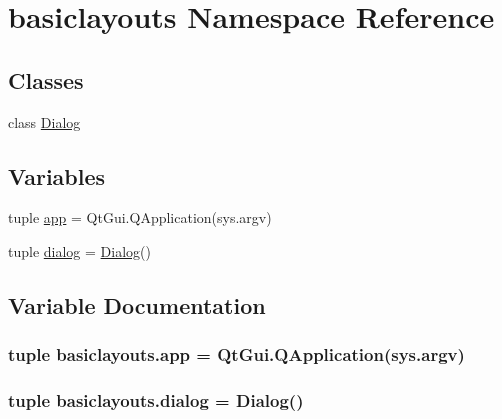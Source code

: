 \hypertarget{namespacebasiclayouts}{}\section{basiclayouts Namespace Reference}
\label{namespacebasiclayouts}
\subsection*{Classes}
\begin{DoxyCompactItemize}
\item 
class \hyperlink{classbasiclayouts_1_1Dialog}{Dialog}
\end{DoxyCompactItemize}
\subsection*{Variables}
\begin{DoxyCompactItemize}
\item 
tuple \hyperlink{namespacebasiclayouts_a4cdcdb35198e79ef26590fa42f82c362}{app} = Qt\+Gui.\+Q\+Application(sys.\+argv)
\item 
tuple \hyperlink{namespacebasiclayouts_a2ddb5b7046ab7b46b1d923a435b3187a}{dialog} = \hyperlink{classbasiclayouts_1_1Dialog}{Dialog}()
\end{DoxyCompactItemize}


\subsection{Variable Documentation}
\hypertarget{namespacebasiclayouts_a4cdcdb35198e79ef26590fa42f82c362}{}
\subsubsection[{app}]{\setlength{\rightskip}{0pt plus 5cm}tuple basiclayouts.\+app = Qt\+Gui.\+Q\+Application(sys.\+argv)}\label{namespacebasiclayouts_a4cdcdb35198e79ef26590fa42f82c362}
\hypertarget{namespacebasiclayouts_a2ddb5b7046ab7b46b1d923a435b3187a}{}
\subsubsection[{dialog}]{\setlength{\rightskip}{0pt plus 5cm}tuple basiclayouts.\+dialog = {\bf Dialog}()}\label{namespacebasiclayouts_a2ddb5b7046ab7b46b1d923a435b3187a}

